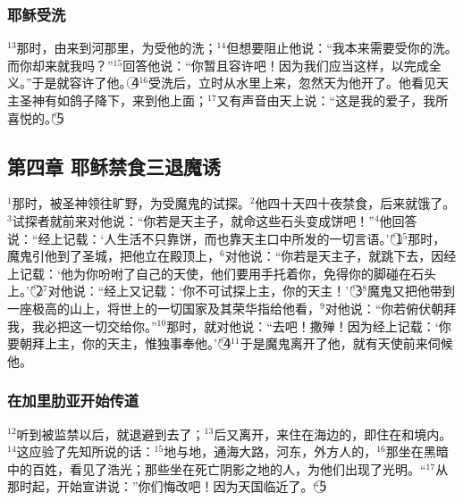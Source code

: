 \subsubsection{耶稣受洗}
$^{13}$那时，\UL[耶稣]由\UL[加里肋亚]来到\UL[约但]河\UL[若翰]那里，为受他的洗；$^{14}$但\UL[若翰]想要阻止他说：“我本来需要受你的洗。而你却来就我吗？”$^{15}$\UL[耶稣]回答他说：“你暂且容许吧！因为我们应当这样，以完成全义。”于是\UL[若翰]就容许了他。\textcircled{4}$^{16}$\UL[耶稣]受洗后，立时从水里上来，忽然天为他开了。他看见天主圣神有如鸽子降下，来到他上面；$^{17}$又有声音由天上说：“这是我的爱子，我所喜悦的。”\textcircled{5}


\subsection{第四章 耶稣禁食三退魔诱}
$^{1}$那时，\UL[耶稣]被圣神领往旷野，为受魔鬼的试探。$^{2}$他四十天四十夜禁食，后来就饿了。$^{3}$试探者就前来对他说：“你若是天主子，就命这些石头变成饼吧！”$^{4}$他回答说：“经上记载：‘人生活不只靠饼，而也靠天主口中所发的一切言语。’”\textcircled{1}$^{5}$那时，魔鬼引他到了圣城，把他立在殿顶上，$^{6}$对他说：“你若是天主子，就跳下去，因经上记载：‘他为你吩咐了自己的天使，他们要用手托着你，免得你的脚碰在石头上。’”\textcircled{2}$^{7}$\UL[耶稣]对他说：“经上又记载：‘你不可试探上主，你的天主！’”\textcircled{3}$^{8}$魔鬼又把他带到一座极高的山上，将世上的一切国家及其荣华指给他看，$^{9}$对他说：“你若俯伏朝拜我，我必把这一切交给你。”$^{10}$那时，\UL[耶稣]就对他说：“去吧！撒殚！因为经上记载：‘你要朝拜上主，你的天主，惟独事奉他。’”\textcircled{4}$^{11}$于是魔鬼离开了他，就有天使前来伺候他。


\subsubsection{在加里肋亚开始传道}
$^{12}$\UL[耶稣]听到\UL[若翰]被监禁以后，就退避到\UL[加里肋亚]去了；$^{13}$后又离开\UL[纳匝肋]，来住在海边的\UL[葛法翁]，即住在\UL[则步隆]和\UL[纳斐塔里]境内。$^{14}$这应验了\UL[依撒意亚]先知所说的话：$^{15}$\UL[则步隆]地与\UL[纳斐塔里]地，通海大路，\UL[约但]河东，外方人的\UL[加里肋亚]，$^{16}$那坐在黑暗中的百姓，看见了浩光；那些坐在死亡阴影之地的人，为他们出现了光明。“$^{17}$从那时起，\UL[耶稣]开始宣讲说：”你们悔改吧！因为天国临近了。“\textcircled{5}


